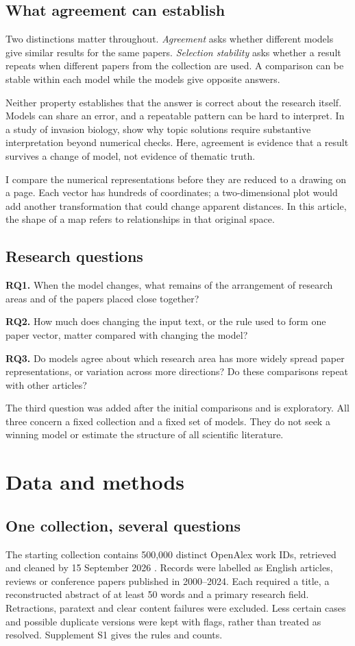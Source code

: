 \subsection{What agreement can establish}
Two distinctions matter throughout. \emph{Agreement} asks whether different models give similar results for the same papers. \emph{Selection stability} asks whether a result repeats when different papers from the collection are used. A comparison can be stable within each model while the models give opposite answers.

Neither property establishes that the answer is correct about the research itself. Models can share an error, and a repeatable pattern can be hard to interpret. In a study of invasion biology, \citet{QSSreviewQ17} show why topic solutions require substantive interpretation beyond numerical checks. Here, agreement is evidence that a result survives a change of model, not evidence of thematic truth.

I compare the numerical representations before they are reduced to a drawing on a page. Each vector has hundreds of coordinates; a two-dimensional plot would add another transformation that could change apparent distances. In this article, the shape of a map refers to relationships in that original space.

\subsection{Research questions}
\textbf{RQ1.} When the model changes, what remains of the arrangement of research areas and of the papers placed close together?

\textbf{RQ2.} How much does changing the input text, or the rule used to form one paper vector, matter compared with changing the model?

\textbf{RQ3.} Do models agree about which research area has more widely spread paper representations, or variation across more directions? Do these comparisons repeat with other articles?

The third question was added after the initial comparisons and is exploratory. All three concern a fixed collection and a fixed set of models. They do not seek a winning model or estimate the structure of all scientific literature.

\section{Data and methods}
\subsection{One collection, several questions}
The starting collection contains 500,000 distinct OpenAlex work IDs, retrieved and cleaned by 15 September 2026 \citep{priem2022openalex}. Records were labelled as English articles, reviews or conference papers published in 2000--2024. Each required a title, a reconstructed abstract of at least 50 words and a primary research field. Retractions, paratext and clear content failures were excluded. Less certain cases and possible duplicate versions were kept with flags, rather than treated as resolved. Supplement S1 gives the rules and counts.

